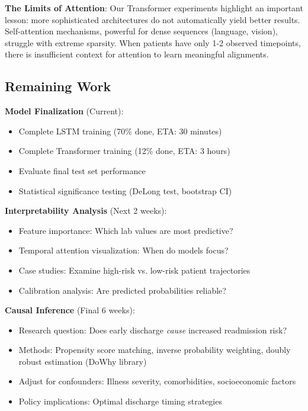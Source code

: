\documentclass[conference]{IEEEtran}
\begin{document}
\textbf{The Limits of Attention}: Our Transformer experiments highlight an important lesson: more sophisticated architectures do not automatically yield better results. Self-attention mechanisms, powerful for dense sequences (language, vision), struggle with extreme sparsity. When patients have only 1-2 observed timepoints, there is insufficient context for attention to learn meaningful alignments.

\subsection{Remaining Work}

\textbf{Model Finalization} (Current):
\begin{itemize}
    \item Complete LSTM training (70\% done, ETA: 30 minutes)
    \item Complete Transformer training (12\% done, ETA: 3 hours)
    \item Evaluate final test set performance
    \item Statistical significance testing (DeLong test, bootstrap CI)
\end{itemize}

\textbf{Interpretability Analysis} (Next 2 weeks):
\begin{itemize}
    \item Feature importance: Which lab values are most predictive?
    \item Temporal attention visualization: When do models focus?
    \item Case studies: Examine high-risk vs. low-risk patient trajectories
    \item Calibration analysis: Are predicted probabilities reliable?
\end{itemize}

\textbf{Causal Inference} (Final 6 weeks):
\begin{itemize}
    \item Research question: Does early discharge \textit{cause} increased readmission risk?
    \item Methods: Propensity score matching, inverse probability weighting, doubly robust estimation (DoWhy library)
    \item Adjust for confounders: Illness severity, comorbidities, socioeconomic factors
    \item Policy implications: Optimal discharge timing strategies
\end{itemize}
\end{document}
